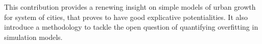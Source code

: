 This contribution provides a renewing insight on simple models of urban growth for system of cities, that proves to have good explicative potentialities. It also introduce a methodology to tackle the open question of quantifying overfitting in simulation models.


\bigskip


\bigskip







%
%



